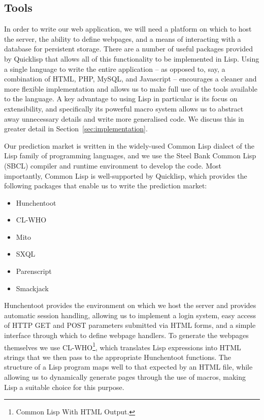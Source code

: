 \subsection{Tools}

In order to write our web application, we will need a platform on which to host
the server, the ability to define webpages, and a means of interacting with a
database for persistent storage. There are a number of useful packages provided
by Quicklisp that allows all of this functionality to be implemented in Lisp.
Using a single language to write the entire application -- as opposed to, say,
a combination of HTML, PHP, MySQL, and Javascript -- encourages a cleaner and
more flexible implementation and allows us to make full use of the tools
available to the language. A key advantage to using Lisp in particular is its
focus on extensibility, and specifically its powerful macro system allows us to
abstract away unnecessary details and write more generalised code. We discuss
this in greater detail in Section~\ref{sec:implementation}.

Our prediction market is written in the widely-used Common Lisp dialect of the
Lisp family of programming languages, and we use the Steel Bank Common Lisp
(SBCL) compiler and runtime environment to develop the code. Most importantly,
Common Lisp is well-supported by Quicklisp, which provides the following
packages that enable us to write the prediction market:

\begin{itemize}
	\item Hunchentoot \cite{Hunchentoot}
	\item CL-WHO \cite{CL-WHO}
	\item Mito \cite{Mito}
	\item SXQL \cite{SXQL}
	\item Parenscript \cite{Parenscript}
	\item Smackjack \cite{Smackjack}
\end{itemize}

Hunchentoot provides the environment on which we host the server and provides
automatic session handling, allowing us to implement a login system, easy
access of HTTP GET and POST parameters submitted via HTML forms, and a simple
interface through which to define webpage handlers. To generate the webpages
themselves we use CL-WHO\footnote{Common Lisp With HTML Output.}, which
translates Lisp expressions into HTML strings that we then pass to the
appropriate Hunchentoot functions. The structure of a Lisp program maps well to
that expected by an HTML file, while allowing us to dynamically generate pages
through the use of macros, making Lisp a suitable choice for this purpose.

